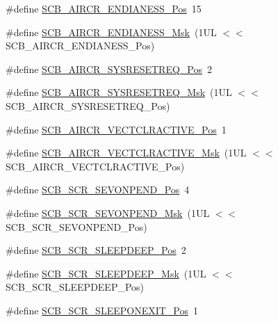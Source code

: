 \begin{DoxyCompactItemize}
\item 
\#define \hyperlink{group___c_m_s_i_s___s_c_b_gad31dec98fbc0d33ace63cb1f1a927923}{S\+C\+B\+\_\+\+A\+I\+R\+C\+R\+\_\+\+E\+N\+D\+I\+A\+N\+E\+S\+S\+\_\+\+Pos}~15
\item 
\#define \hyperlink{group___c_m_s_i_s___s_c_b_ga2f571f93d3d4a6eac9a3040756d3d951}{S\+C\+B\+\_\+\+A\+I\+R\+C\+R\+\_\+\+E\+N\+D\+I\+A\+N\+E\+S\+S\+\_\+\+Msk}~(1\+U\+L $<$$<$ S\+C\+B\+\_\+\+A\+I\+R\+C\+R\+\_\+\+E\+N\+D\+I\+A\+N\+E\+S\+S\+\_\+\+Pos)
\item 
\#define \hyperlink{group___c_m_s_i_s___s_c_b_gaffb2737eca1eac0fc1c282a76a40953c}{S\+C\+B\+\_\+\+A\+I\+R\+C\+R\+\_\+\+S\+Y\+S\+R\+E\+S\+E\+T\+R\+E\+Q\+\_\+\+Pos}~2
\item 
\#define \hyperlink{group___c_m_s_i_s___s_c_b_gaae1181119559a5bd36e62afa373fa720}{S\+C\+B\+\_\+\+A\+I\+R\+C\+R\+\_\+\+S\+Y\+S\+R\+E\+S\+E\+T\+R\+E\+Q\+\_\+\+Msk}~(1\+U\+L $<$$<$ S\+C\+B\+\_\+\+A\+I\+R\+C\+R\+\_\+\+S\+Y\+S\+R\+E\+S\+E\+T\+R\+E\+Q\+\_\+\+Pos)
\item 
\#define \hyperlink{group___c_m_s_i_s___s_c_b_gaa30a12e892bb696e61626d71359a9029}{S\+C\+B\+\_\+\+A\+I\+R\+C\+R\+\_\+\+V\+E\+C\+T\+C\+L\+R\+A\+C\+T\+I\+V\+E\+\_\+\+Pos}~1
\item 
\#define \hyperlink{group___c_m_s_i_s___s_c_b_ga212c5ab1c1c82c807d30d2307aa8d218}{S\+C\+B\+\_\+\+A\+I\+R\+C\+R\+\_\+\+V\+E\+C\+T\+C\+L\+R\+A\+C\+T\+I\+V\+E\+\_\+\+Msk}~(1\+U\+L $<$$<$ S\+C\+B\+\_\+\+A\+I\+R\+C\+R\+\_\+\+V\+E\+C\+T\+C\+L\+R\+A\+C\+T\+I\+V\+E\+\_\+\+Pos)
\item 
\#define \hyperlink{group___c_m_s_i_s___s_c_b_ga3bddcec40aeaf3d3a998446100fa0e44}{S\+C\+B\+\_\+\+S\+C\+R\+\_\+\+S\+E\+V\+O\+N\+P\+E\+N\+D\+\_\+\+Pos}~4
\item 
\#define \hyperlink{group___c_m_s_i_s___s_c_b_gafb98656644a14342e467505f69a997c9}{S\+C\+B\+\_\+\+S\+C\+R\+\_\+\+S\+E\+V\+O\+N\+P\+E\+N\+D\+\_\+\+Msk}~(1\+U\+L $<$$<$ S\+C\+B\+\_\+\+S\+C\+R\+\_\+\+S\+E\+V\+O\+N\+P\+E\+N\+D\+\_\+\+Pos)
\item 
\#define \hyperlink{group___c_m_s_i_s___s_c_b_gab304f6258ec03bd9a6e7a360515c3cfe}{S\+C\+B\+\_\+\+S\+C\+R\+\_\+\+S\+L\+E\+E\+P\+D\+E\+E\+P\+\_\+\+Pos}~2
\item 
\#define \hyperlink{group___c_m_s_i_s___s_c_b_ga77c06a69c63f4b3f6ec1032e911e18e7}{S\+C\+B\+\_\+\+S\+C\+R\+\_\+\+S\+L\+E\+E\+P\+D\+E\+E\+P\+\_\+\+Msk}~(1\+U\+L $<$$<$ S\+C\+B\+\_\+\+S\+C\+R\+\_\+\+S\+L\+E\+E\+P\+D\+E\+E\+P\+\_\+\+Pos)
\item 
\#define \hyperlink{group___c_m_s_i_s___s_c_b_ga3680a15114d7fdc1e25043b881308fe9}{S\+C\+B\+\_\+\+S\+C\+R\+\_\+\+S\+L\+E\+E\+P\+O\+N\+E\+X\+I\+T\+\_\+\+Pos}~1
$$
\end{DoxyCompactItemize}
